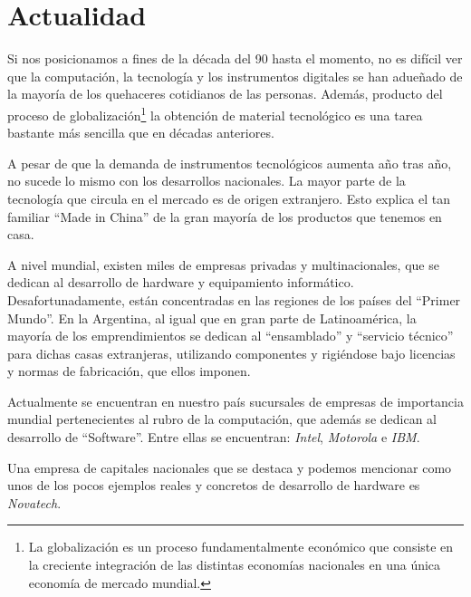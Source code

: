 \documentclass[%
  	final,
%
	notitlepage,
	narroweqnarray,
	inline,
 	twoside,
	]{ieee}
\begin{document}
\section{Actualidad}

Si nos posicionamos a fines de la d\'ecada del 90 hasta el momento, no es dif\'icil ver que la computaci\'on, la tecnolog\'ia y los instrumentos digitales se han adue\~nado de la mayor\'ia de los quehaceres cotidianos de las personas. Adem\'as, producto del proceso de globalizaci\'on\footnote{La globalizaci\'on es un proceso fundamentalmente econ\'omico que consiste en la creciente integraci\'on de las distintas econom\'ias nacionales en una \'unica econom\'ia de mercado mundial.} la obtenci\'on de material tecnol\'ogico es una tarea bastante m\'as sencilla que en d\'ecadas anteriores.

A pesar de que la demanda de instrumentos tecnol\'ogicos aumenta a\~no tras a\~no, no sucede lo mismo con los desarrollos nacionales. La mayor parte de la tecnolog\'ia que circula en el mercado es de origen extranjero. Esto explica el tan familiar ``Made in China'' de la gran mayor\'ia de los productos que tenemos en casa.

A nivel mundial, existen miles de empresas privadas y multinacionales, que se dedican al desarrollo de hardware y equipamiento inform\'atico. Desafortunadamente, est\'an concentradas en las regiones de los pa\'ises del ``Primer Mundo''. En la Argentina, al igual que en gran parte de Latinoam\'erica, la mayor\'ia de los emprendimientos se dedican al ``ensamblado'' y ``servicio t\'ecnico'' para dichas casas extranjeras, utilizando componentes y rigi\'endose bajo licencias y normas de fabricaci\'on, que ellos imponen.

Actualmente se encuentran en nuestro pa\'is sucursales de empresas de importancia mundial pertenecientes al rubro de la computaci\'on, que adem\'as se dedican al desarrollo de ``Software''. Entre ellas se encuentran: \textit{Intel}, \textit{Motorola} e \textit{IBM}.

Una empresa de capitales nacionales que se destaca y podemos mencionar como unos de los pocos ejemplos reales y concretos de desarrollo de hardware es \textit{Novatech}.\\
\end{document}
